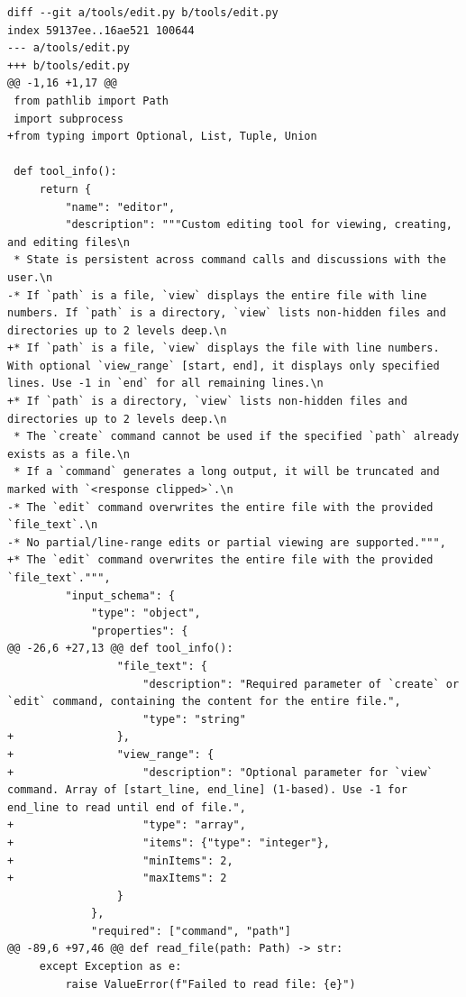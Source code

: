 \documentclass{article} %
\begin{document}
\begin{lstlisting}[style=diffstyle]
diff --git a/tools/edit.py b/tools/edit.py
index 59137ee..16ae521 100644
--- a/tools/edit.py
+++ b/tools/edit.py
@@ -1,16 +1,17 @@
 from pathlib import Path
 import subprocess
+from typing import Optional, List, Tuple, Union
 
 def tool_info():
     return {
         "name": "editor",
         "description": """Custom editing tool for viewing, creating, and editing files\n
 * State is persistent across command calls and discussions with the user.\n
-* If `path` is a file, `view` displays the entire file with line numbers. If `path` is a directory, `view` lists non-hidden files and directories up to 2 levels deep.\n
+* If `path` is a file, `view` displays the file with line numbers. With optional `view_range` [start, end], it displays only specified lines. Use -1 in `end` for all remaining lines.\n
+* If `path` is a directory, `view` lists non-hidden files and directories up to 2 levels deep.\n
 * The `create` command cannot be used if the specified `path` already exists as a file.\n
 * If a `command` generates a long output, it will be truncated and marked with `<response clipped>`.\n
-* The `edit` command overwrites the entire file with the provided `file_text`.\n
-* No partial/line-range edits or partial viewing are supported.""",
+* The `edit` command overwrites the entire file with the provided `file_text`.""",
         "input_schema": {
             "type": "object",
             "properties": {
@@ -26,6 +27,13 @@ def tool_info():
                 "file_text": {
                     "description": "Required parameter of `create` or `edit` command, containing the content for the entire file.",
                     "type": "string"
+                },
+                "view_range": {
+                    "description": "Optional parameter for `view` command. Array of [start_line, end_line] (1-based). Use -1 for end_line to read until end of file.",
+                    "type": "array",
+                    "items": {"type": "integer"},
+                    "minItems": 2,
+                    "maxItems": 2
                 }
             },
             "required": ["command", "path"]
@@ -89,6 +97,46 @@ def read_file(path: Path) -> str:
     except Exception as e:
         raise ValueError(f"Failed to read file: {e}")
 

\end{lstlisting}
\end{document}

